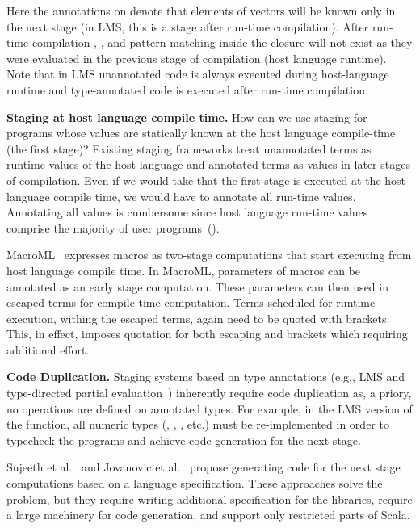 Here the  annotations on  denote that elements of vectors will be known
 only in the next stage (in LMS, this is a stage after run-time compilation). After run-time compilation ,
 , and pattern matching inside the closure will not exist
 as they were evaluated in the previous stage of compilation (host language runtime). Note that in
 LMS unannotated code is always executed during host-language runtime
 and type-annotated code is executed after run-time compilation.

{\bf Staging at host language compile time.} How can we use staging for programs whose values are statically
 known at the host language compile-time (the first stage)? Existing staging frameworks
 treat unannotated terms as runtime values of the host language and annotated terms as
 values in later stages of compilation. Even if we would take that the first stage is executed
 at the host language compile time, we would have to annotate all run-time values.
 Annotating all values is cumbersome since host language run-time values comprise
 the majority of user programs~().


MacroML~\cite{ganz2001macros} expresses macros as two-stage computations that start executing from host language compile time.
 In MacroML, parameters of macros can be annotated as an early stage computation. These parameters
 can then used in escaped terms for compile-time computation. Terms scheduled for runtime execution,
 withing the escaped terms, again need to be quoted with brackets. This,
 in effect, imposes quotation for both escaping and brackets which requiring additional effort.

{\bf Code Duplication.} Staging systems based on type annotations (e.g., LMS and type-directed
partial evaluation~\cite{danvy1999type}) inherently require code duplication as,
a priory, no operations are defined on  annotated types. For example,
in the LMS version of the  function, all numeric types (\ie, , , etc.)
must be re-implemented in order to typecheck the programs and achieve code generation
for the next stage.

Sujeeth et al.~\cite{forge} and Jovanovic et al.~\cite{yin-yang}
 propose generating code for the next stage computations based on
 a language specification. These approaches solve the problem,
 but they require writing additional specification for the libraries,
 require a large machinery for code generation,
 and support only restricted parts of Scala.

